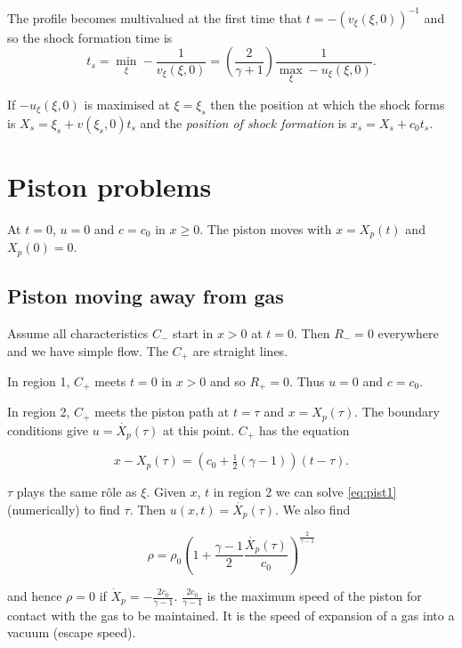 \documentclass{notes}
\begin{document}
The profile becomes multivalued at the first time that
$t = - \left( v_\xi(\xi,0) \right)^{-1}$ and so the shock formation
time is
\[
t_s = \min_{\xi} - \frac{1}{v_\xi(\xi,0)}
= \left( \frac{2}{\gamma+1} \right) \frac{1}{\max_\xi - u_\xi(\xi,0)}.
\]

If $-u_\xi(\xi,0)$ is maximised at $\xi = \xi_s$ then the position at
which the shock forms is $X_s = \xi_s + v(\xi_s,0)t_s$ and
the \emph{position of shock formation} is $x_s = X_s + c_0 t_s$.

\section{Piston problems}

\vspace{1in}

At $t=0$, $u=0$ and $c=c_0$ in $x \ge 0$.  The piston moves with
$x = X_p(t)$ and $X_p(0) = 0$.

\subsection{Piston moving away from gas}

\vspace{2in}

Assume all characteristics $C_-$ start in $x>0$ at $t=0$.  Then
$R_-=0$ everywhere and we have simple flow.  The $C_+$ are straight lines.

In region 1, $C_+$ meets $t=0$ in $x > 0$ and so $R_+ = 0$.  Thus
$u = 0$ and $c=c_0$.

In region 2, $C_+$ meets the piston path at $t=\tau$ and $x=X_p(\tau)$.
The boundary conditions give $u=\dot{X_p}(\tau)$ at this point. $C_+$
has the equation

\begin{equation}\label{eq:pist1}
x - X_p(\tau) = \left( c_0 + \tfrac{1}{2}(\gamma-1)\right)(t - \tau).
\end{equation}

$\tau$ plays the same r\^ole as $\xi$.  Given $x$, $t$ in region 2
we can solve \eqref{eq:pist1} (numerically) to find $\tau$.  Then
$u(x,t) = \dot{X_p}(\tau)$.  We also find

\[
\rho = \rho_0 \left(1 + \frac{\gamma - 1}{2} \frac{\dot{X_p}(\tau)}{c_0}
\right)^{\frac{2}{\gamma-1}}
\]

and hence $\rho = 0$ if $\dot{X}_p = - \frac{2 c_0}{\gamma - 1}$.
$\tfrac{2 c_0}{\gamma - 1}$ is the maximum speed of the piston for contact
with the gas to be maintained.  It is the speed of expansion of a gas
into a vacuum (escape speed).
\end{document}
